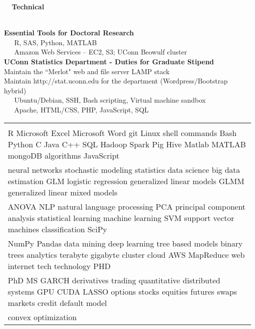 \documentclass{article}
\begin{document}
\vspace{0.3cm}
\begin{large}
\noindent
\hspace{-0.9cm}
  \textbf{~~Technical}
  \vspace{0.1cm}
\end{large}\\
\textbf{Essential Tools for Doctoral Research}\\
~~~R, SAS, Python, MATLAB\\
~~~Amazon Web Services – EC2, S3; UConn Beowulf cluster
\vspace{0.25cm}
\\
\textbf{UConn Statistics Department - Duties for Graduate Stipend} \\
Maintain the ``Merlot" web and file server LAMP stack\\
Maintain http://stat.uconn.edu for the department (Wordpress/Bootstrap hybrid)\\
~~~Ubuntu/Debian, SSH, Bash scripting, Virtual machine sandbox\\
~~~Apache, HTML/CSS, PHP, JavaScript, SQL\\
\textcolor{white}{
{\fontsize{0.05cm}{0.05cm}\selectfont
\hspace{-.5in}
\begin{tabular}{l}
\\
\\
R Microsoft Excel Microsoft Word git Linux shell commands Bash Python C Java C++ SQL Hadoop Spark Pig Hive Matlab MATLAB mongoDB algorithms
JavaScript\\
neural networks stochastic modeling statistics data science big data estimation GLM logistic regression generalized linear models GLMM generalized
linear mixed models\\
ANOVA NLP natural language processing PCA principal component analysis statistical learning machine learning SVM support vector
machines classification SciPy\\
NumPy Pandas data mining deep learning tree based models binary trees analytics terabyte gigabyte cluster cloud
AWS MapReduce web internet tech technology PHD\\
PhD MS GARCH derivatives trading quantitative distributed systems GPU CUDA LASSO options stocks
equities futures swaps markets credit default model\\
convex optimization
\end{tabular}
}
}
\end{document}
